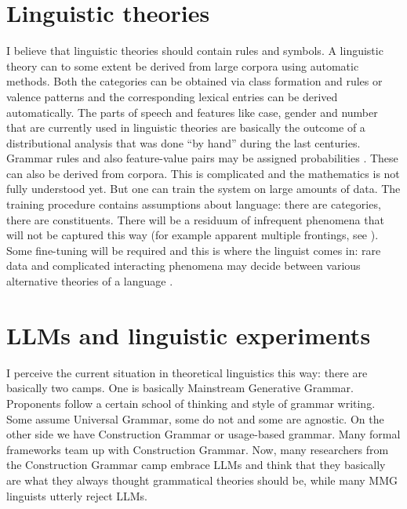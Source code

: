 \section{Linguistic theories}
\label{sec-linguistic-theories}

I believe that linguistic theories should contain rules and symbols. A linguistic theory can to some
extent be derived from large corpora using automatic methods. Both the categories can be obtained
via class formation and rules or valence patterns and the corresponding lexical entries can be
derived automatically. The parts of speech and features like case, gender and
number that are currently used in linguistic theories are basically the outcome of a distributional
analysis that was done ``by hand'' during the last centuries. Grammar rules and also feature-value
pairs may be assigned probabilities \citep{Jurafsky96a}. These can also be derived from corpora. This is complicated and
the mathematics is not fully understood yet. But one can train the system on large amounts of
data. The training procedure contains assumptions about language: there are categories, there are
constituents. There will be a residuum of infrequent phenomena that will not be captured
this way (for example apparent multiple frontings, see \citealt{Mueller2003b}). Some fine-tuning will be
required and this is where the linguist comes in: rare data and complicated interacting phenomena may decide between various alternative
theories of a language \citep[Chapter~6]{MuellerGS}. 
%

\section{LLMs and linguistic experiments}
\label{sec-LLMs-experiments}

I perceive the current situation in theoretical linguistics this way: there are basically two
camps. One is basically Mainstream Generative Grammar. Proponents follow a certain school of
thinking and style of grammar writing. Some assume Universal Grammar, some do not and some are
agnostic. On the other side we have Construction Grammar or usage-based grammar. Many formal
frameworks team up with Construction Grammar. Now, many researchers from the Construction Grammar
camp embrace LLMs and think that they basically are what they always thought grammatical theories
should be, while many MMG linguists utterly reject LLMs.

